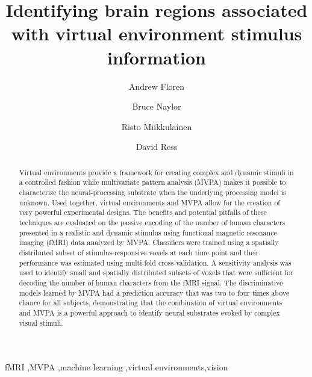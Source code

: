 \documentclass[5p,authoryear]{elsarticle}
\begin{document}
\begin{frontmatter}

\title{Identifying brain regions associated with virtual environment stimulus information}

\author[ECE,NS]{Andrew Floren}

\author[NS]{Bruce Naylor}

\author[CS]{Risto Miikkulainen}

\author[BCM]{David Ress}

\address[ECE]{Department of Electrical and Computer Engineering}
\address[NS]{Department of Neuroscience}
\address[CS]{Computer Science Department \\ The University of Texas at Austin, Austin, TX 78712 USA}
\address[BCM]{Department of Neuroscience \\ Baylor College of Medicine, Houston, TX 77030 USA}


\begin{abstract}
Virtual environments provide a framework for creating complex and dynamic stimuli in a controlled fashion while multivariate pattern analysis (MVPA) makes it possible to characterize the neural-processing substrate when the underlying processing model is unknown. 
Used together, virtual environments and MVPA allow for the creation of very powerful experimental designs. 
The benefits and potential pitfalls of these techniques are evaluated on the passive encoding of the number of human characters presented in a realistic and dynamic stimulus using functional magnetic resonance imaging (fMRI) data analyzed by MVPA. 
Classifiers were trained using a spatially distributed subset of stimulus-responsive voxels at each time point and their performance was estimated using multi-fold cross-validation.
A sensitivity analysis was used to identify small and spatially distributed subsets of voxels that were sufficient for decoding the number of human characters from the fMRI signal.
The discriminative models learned by MVPA had a prediction accuracy that was two to four times above chance for all subjects, demonstrating that the combination of virtual environments and MVPA is a powerful approach to identify neural substrates evoked by complex visual stimuli.
\end{abstract}

\begin{keyword}
fMRI \sep MVPA \sep machine learning \sep virtual environments\sep vision
\end{keyword}

\end{frontmatter}
\end{document}
